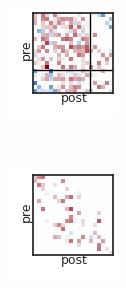 \begin{figure}[t!]
\begin{subfigure}[b]{1.10in}
  \end{subfigure}
  ~
  \hspace{-.1in}
  \begin{subfigure}[b]{1.10in}
    \centering
    \includegraphics[width=\textwidth]{figures/ch3/SBM-Distance.png}
  \end{subfigure}
  ~
  \hspace{-.1in}
  \begin{subfigure}[b]{1.10in}
    \centering
    \includegraphics[width=\textwidth]{figures/ch3/Distance-Distance.png}

\end{subfigure}
\end{figure}
